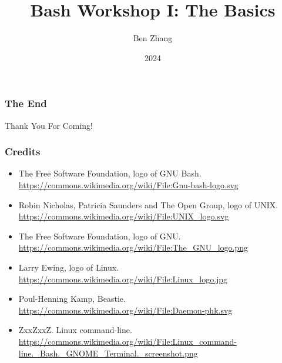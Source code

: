 \documentclass{beamer}
\title{Bash Workshop I: The Basics}
\author{Ben Zhang}
\institute{JITech}
\date{2024}
\begin{document}
\frame{\titlepage}






\begin{frame}
\frametitle{The End}
\vspace{1cm}
\centering \Huge {Thank You For Coming!}
\end{frame}

\begin{frame}
\frametitle{Credits}
\begin{itemize}
    \item The Free Software Foundation, logo of GNU Bash.
        \url{https://commons.wikimedia.org/wiki/File:Gnu-bash-logo.svg}
    \item Robin Nicholas, Patricia Saunders and The Open Group, logo of UNIX.
        \url{https://commons.wikimedia.org/wiki/File:UNIX_logo.svg}
    \item The Free Software Foundation, logo of GNU.
        \url{https://commons.wikimedia.org/wiki/File:The_GNU_logo.png}
    \item Larry Ewing, logo of Linux.
        \url{https://commons.wikimedia.org/wiki/File:Linux_logo.jpg}
    \item Poul-Henning Kamp, Beastie.
        \url{https://commons.wikimedia.org/wiki/File:Daemon-phk.svg}
    \item ZxxZxxZ. Linux command-line.
        \url{https://commons.wikimedia.org/wiki/File:Linux_command-line._Bash._GNOME_Terminal._screenshot.png}
\end{itemize}
\end{frame}
\end{document}
